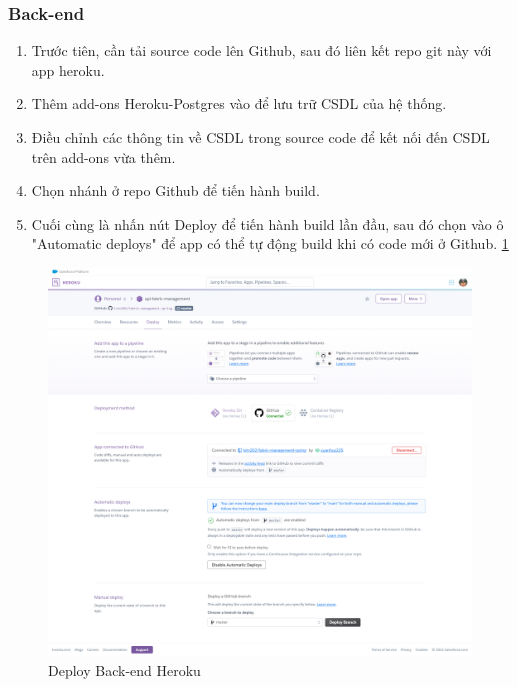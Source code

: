 \subsubsection{Back-end}
\begin{enumerate}
    \item Trước tiên, cần tải source code lên Github, sau đó liên kết repo git này với app heroku.
    \item Thêm add-ons Heroku-Postgres vào để lưu trữ CSDL của hệ thống.
    \item Điều chỉnh các thông tin về CSDL trong source code để kết nối đến CSDL trên add-ons vừa thêm.
    \item Chọn nhánh ở repo Github để tiến hành build.
    \item Cuối cùng là nhấn nút Deploy để tiến hành build lần đầu, sau đó chọn vào ô "Automatic deploys" để app có thể tự động build khi có code mới ở Github. \ref{deploy_back_end}
\end{enumerate}

\begin{figure}[H]
    \begin{center}
        \includegraphics[width=14cm]{Image/Technical/deploy-back-end.png}
        \caption{Deploy Back-end Heroku}
        \label{deploy_back_end}
    \end{center}
\end{figure}